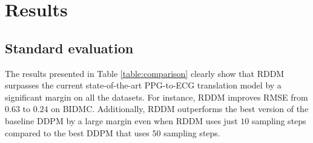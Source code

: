 \documentclass[letterpaper]{article} %
\begin{document}
\section{Results}

\subsection{Standard evaluation}
The results presented in Table \ref{table:comparison} clearly show that RDDM surpasses the current state-of-the-art PPG-to-ECG translation model \cite{sarkar2021cardiogan}  by a significant margin on all the datasets. For instance, RDDM improves RMSE from $0.63$ to $0.24$ on BIDMC. Additionally, RDDM outperforms the best version of the baseline DDPM by a large margin even when RDDM uses just $10$ sampling steps compared to the best DDPM that uses $50$ sampling steps. 
\end{document}
